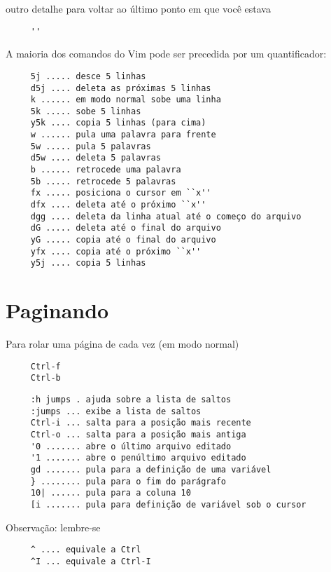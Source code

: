 outro detalhe para voltar ao último ponto em que você estava

\begin{verbatim}
     ''
\end{verbatim}

A maioria dos comandos do Vim pode ser precedida por um quantificador:

\begin{verbatim}
     5j ..... desce 5 linhas
     d5j .... deleta as próximas 5 linhas
     k ...... em modo normal sobe uma linha
     5k ..... sobe 5 linhas
     y5k .... copia 5 linhas (para cima)
     w ...... pula uma palavra para frente
     5w ..... pula 5 palavras
     d5w .... deleta 5 palavras
     b ...... retrocede uma palavra
     5b ..... retrocede 5 palavras
     fx ..... posiciona o cursor em ``x''
     dfx .... deleta até o próximo ``x''
     dgg .... deleta da linha atual até o começo do arquivo
     dG ..... deleta até o final do arquivo
     yG ..... copia até o final do arquivo
     yfx .... copia até o próximo ``x''
     y5j .... copia 5 linhas
\end{verbatim}

\section{Paginando}
\label{Paginando}

Para rolar uma página de cada vez (em modo normal)

\begin{verbatim}
     Ctrl-f
     Ctrl-b
\end{verbatim}

\begin{verbatim}
     :h jumps . ajuda sobre a lista de saltos
     :jumps ... exibe a lista de saltos
     Ctrl-i ... salta para a posição mais recente
     Ctrl-o ... salta para a posição mais antiga
     '0 ....... abre o último arquivo editado
     '1 ....... abre o penúltimo arquivo editado
     gd ....... pula para a definição de uma variável
     } ........ pula para o fim do parágrafo
     10| ...... pula para a coluna 10
     [i ....... pula para definição de variável sob o cursor
\end{verbatim}

Observação: lembre-se

\begin{verbatim}
     ^ .... equivale a Ctrl
     ^I ... equivale a Ctrl-I
\end{verbatim}

